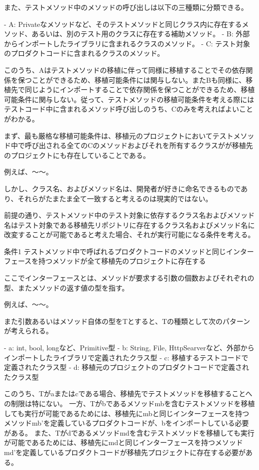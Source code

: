 \documentclass[conference]{IEEEtran}
\begin{document}
また、テストメソッド中のメソッドの呼び出しは以下の三種類に分類できる。

- A: Privateなメソッドなど、そのテストメソッドと同じクラス内に存在するメソッド、あるいは、別のテスト用のクラスに存在する補助メソッド。
- B: 外部からインポートしたライブラリに含まれるクラスのメソッド。
- C: テスト対象のプロダクトコードに含まれるクラスのメソッド。

このうち、Aはテストメソッドの移植に伴って同様に移植することでその依存関係を保つことができるため、移植可能条件には関与しない。またBも同様に、移植先で同じようにインポートすることで依存関係を保つことができるため、移植可能条件に関与しない。従って、テストメソッドの移植可能条件を考える際にはテストコード中に含まれるメソッド呼び出しのうち、Cのみを考えればよいことがわかる。

まず、最も厳格な移植可能条件は、移植元のプロジェクトにおいてテストメソッド中で呼び出される全てのCのメソッドおよびそれを所有するクラスがが移植先のプロジェクトにも存在していることである。

例えば、〜〜。

しかし、クラス名、およびメソッド名は、開発者が好きに命名できるものであり、それらがたまたま全て一致すると考えるのは現実的ではない。

前提の通り、テストメソッド中のテスト対象に依存するクラス名およびメソッド名はテスト対象である移植先リポジトリに存在するクラス名およびメソッド名に改変することが可能であると考えた場合、それが実行可能になる条件を考える。

条件1 テストメソッド中で呼ばれるプロダクトコードのメソッドと同じインターフェースを持つメソッドが全て移植先のプロジェクトに存在する

ここでインターフェースとは、メソッドが要求する引数の個数およびそれぞれの型、またメソッドの返す値の型を指す。

例えば、〜〜。

また引数あるいはメソッド自体の型をTとすると、Tの種類として次のパターンが考えられる。

- a: int, bool, longなど、Primitive型
- b: String, File, HttpSearverなど、外部からインポートしたライブラリで定義されたクラス型
- c: 移植するテストコードで定義されたクラス型
- d: 移植元のプロジェクトのプロダクトコードで定義されたクラス型

このうち、Tがaまたはcである場合、移植先でテストメソッドを移植することへの制限は特にない。
一方、Tがbであるメソッドmbを含むテストメソッドを移植しても実行が可能であるためには、移植先にmbと同じインターフェースを持つメソッドmb'を定義しているプロダクトコードが、bをインポートしている必要がある。
また、Tがdであるメソッドmdを含むテストメソッドを移植しても実行が可能であるためには、移植先にmdと同じインターフェースを持つメソッドmd'を定義しているプロダクトコードが移植先プロジェクトに存在する必要がある。
\end{document}
